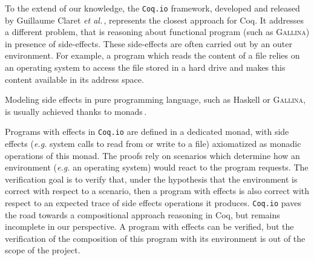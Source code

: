 
To the extend of our knowledge, the \texttt{Coq.io} framework, developed and
released by Guillaume Claret \emph{et al.}\,\cite{claret2015coqiowww},
represents the closest approach for Coq.
%
It addresses a different problem, that is reasoning about functional program
(such as {\scshape Gallina}) in presence of side-effects.
%
These side-effects are often carried out by an outer environment.
%
For example, a program which reads the content of a file relies on an operating
system to access the file stored in a hard drive and makes this content
available in its address space.

Modeling side effects in pure programming language, such as Haskell or {\scshape
  Gallina}, is usually achieved thanks to
monads\,\cite{wadler1990comprehending,jones2005io}. 

Programs with effects in \texttt{Coq.io} are defined in a dedicated monad, with
side effects (\emph{e.g.}  system calls to read from or write to a file)
axiomatized as monadic operations of this monad.
%
The proofs rely on scenarios which determine how an environment (\emph{e.g.} an
operating system) would react to the program requests.
%
The verification goal is to verify that, under the hypothesis that the
environment is correct with respect to a scenario, then a program with effects
is also correct with respect to an expected trace of side effects operations it
produces.
%
\texttt{Coq.io} paves the road towards a compositional approach reasoning in
Coq, but remains incomplete in our perspective.
%
A program with effects can be verified, but the verification of the composition
of this program with its environment is out of the scope of the project.

